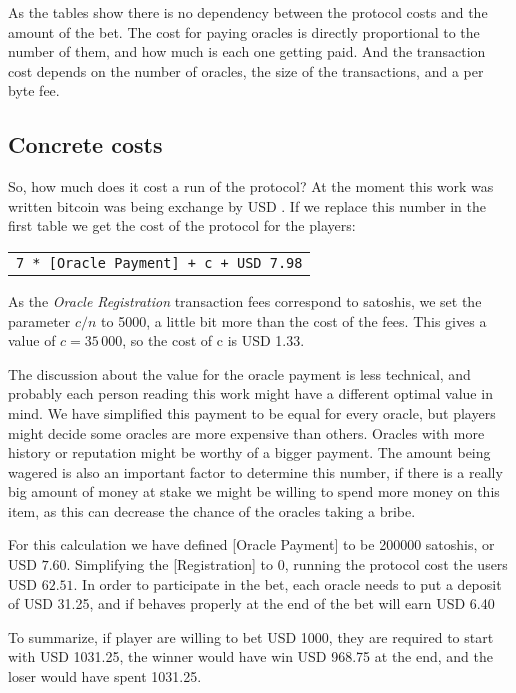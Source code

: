 As the tables show there is no dependency between the protocol costs and the
  amount of the bet.
The cost for paying oracles is directly proportional to the number of them, and
  how much is each one getting paid.
And the transaction cost depends on the number of oracles, the size of the
  transactions, and a per byte fee.

\subsection{Concrete costs}

So, how much does it cost a run of the protocol?
At the moment this work was written bitcoin was being exchange by USD
  \bitcoinusd{}.
If we replace this number in the first table we get the cost of the protocol for
  the players:
\begin{center}
    \begin{tabular}{|c|}
        \texttt{7 * [Oracle Payment] + c + USD 7.98}
    \end{tabular}
\end{center}

As the \textit{Oracle Registration} transaction fees correspond to
  \mbox{} satoshis, we set the parameter $c/n$ to 5000, a
  little bit more than the cost of the fees.
This gives a value of $c = 35\,000$, so the cost of c is USD 1.33.

The discussion about the value for the oracle payment is less technical, and
  probably each person reading this work might have a different optimal value
  in mind.
We have simplified this payment to be equal for every oracle, but players
  might decide some oracles are more expensive than others.
Oracles with more history or reputation might be worthy of a bigger payment.
The amount being wagered is also an important factor to determine this number,
  if there is a really big amount of money at stake we might be willing to
  spend more money on this item, as this can decrease the chance of the oracles
  taking a bribe.

For this calculation we have defined [Oracle Payment] to be \num{200000}
  satoshis, or USD $7.60$. Simplifying the [Registration] to 0, running the
  protocol cost the users USD $62.51$.
In order to participate in the bet, each oracle needs to put a deposit of
  USD 31.25, and if behaves properly at the end of the bet will earn USD 6.40

To summarize, if player are willing to bet USD 1000, they are required to start
  with USD 1031.25, the winner would have win USD 968.75 at the end, and the
  loser would have spent 1031.25.

